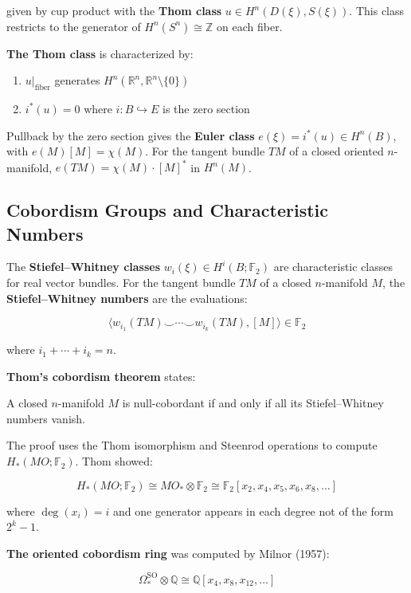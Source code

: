 given by cup product with the \textbf{Thom class} $u \in H^n(D(\xi), S(\xi))$.
This class restricts to the generator of $H^n(S^n) \cong \mathbb{Z}$ on each
fiber.

\textbf{The Thom class} is characterized by:
\begin{enumerate}
\item $u|_{\text{fiber}}$ generates $H^n(\mathbb{R}^n, \mathbb{R}^n \setminus \{0\})$
\item $i^*(u) = 0$ where $i: B \hookrightarrow E$ is the zero section
\end{enumerate}

Pullback by the zero section gives the \textbf{Euler class} $e(\xi) = i^*(u) \in
H^n(B)$, with $e(M)[M] = \chi(M)$. For the tangent bundle $TM$ of a closed
oriented $n$-manifold, $e(TM) = \chi(M) \cdot [M]^*$ in $H^n(M)$.

\subsection{Cobordism Groups and Characteristic Numbers}

The \textbf{Stiefel--Whitney classes} $w_i(\xi) \in H^i(B; \mathbb{F}_2)$ are
characteristic classes for real vector bundles. For the tangent bundle $TM$ of a
closed $n$-manifold $M$, the \textbf{Stiefel--Whitney numbers} are the
evaluations:

\[\langle w_{i_1}(TM) \smile \cdots \smile w_{i_k}(TM), [M] \rangle \in \mathbb{F}_2\]

where $i_1 + \cdots + i_k = n$.

\textbf{Thom's cobordism theorem} states:
\begin{theorem}
A closed $n$-manifold $M$ is null-cobordant if and only if all its
Stiefel--Whitney numbers vanish.
\end{theorem}

The proof uses the Thom isomorphism and Steenrod operations to compute
$H_*(MO; \mathbb{F}_2)$. Thom showed:

\[H_*(MO; \mathbb{F}_2) \cong MO_* \otimes \mathbb{F}_2 \cong \mathbb{F}_2[x_2, x_4,
x_5, x_6, x_8, \ldots]\]

where $\deg(x_i) = i$ and one generator appears in each degree not of the form
$2^k - 1$.

\textbf{The oriented cobordism ring} was computed by Milnor (1957):

\[\Omega_*^{\text{SO}} \otimes \mathbb{Q} \cong \mathbb{Q}[x_4, x_8, x_{12},
\ldots]\]

